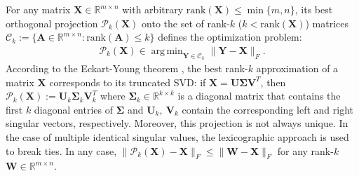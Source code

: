 \documentclass[twocolumn]{svjour3}
\newcommand{\vectornormbig}[1]{\big\|#1\big\|}
\newcommand{\signal}{\boldsymbol{X}}
\newcommand{\dimension}{m \times n}
\newcommand{\rank}{k}
\DeclareMathOperator*{\argmin}{arg\,min}
\begin{document}
For any matrix $ \boldsymbol{X} \in \mathbb{R}^{\dimension} $ with arbitrary $ \text{rank}(\boldsymbol{X}) \leq \min \lbrace m, n \rbrace $, its best orthogonal projection $ \mathcal{P}_{\rank}(\signal) $ onto the set of rank-$ \rank $ ($ k < \text{rank}(\boldsymbol{X}) $) matrices $ \mathcal{C}_\rank := \lbrace \boldsymbol{A} \in \mathbb{R}^{m \times n}: \text{rank}(\boldsymbol{A}) \leq k \rbrace $ defines the optimization problem:
\begin{align}
\mathcal{P}_k(\boldsymbol{X}) \in \argmin_{\boldsymbol{Y} \in \mathcal{C}_{\rank}} \vectornormbig{\boldsymbol{Y} - \boldsymbol{X}}_{F}. \label{eq:svd_proj}
\end{align} According to the Eckart-Young theorem \cite{horn1990matrix}, the best rank-$ \rank $ approximation of a matrix $ \boldsymbol{X} $ corresponds to its truncated SVD: if $ \boldsymbol{X} = \boldsymbol{U} \boldsymbol{\Sigma} \boldsymbol{V}^{T} $, then $ \mathcal{P}_k(\boldsymbol{X}) := \boldsymbol{U}_k \boldsymbol{\Sigma}_k \boldsymbol{V}_k^{T} $ where $ \boldsymbol{\Sigma}_k \in \mathbb{R}^{\rank \times \rank} $ is a diagonal matrix that contains the first $ \rank $ diagonal entries of $ \boldsymbol{\Sigma} $ and $\boldsymbol{U}_k, ~\boldsymbol{V}_k$ contain the corresponding left and right singular vectors, respectively. Moreover, this projection is not always unique. In the case of multiple identical singular values, the lexicographic approach is used to break ties. In any case, $\vectornormbig{\mathcal{P}_k(\boldsymbol{X}) - \boldsymbol{X}}_F \leq \vectornormbig{\boldsymbol{W} - \boldsymbol{X}}_F$ for any rank-$\rank$ $\boldsymbol{W} \in \mathbb{R}^{\dimension}$.
\end{document}
